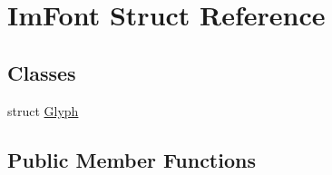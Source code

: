 \hypertarget{struct_im_font}{}\section{Im\+Font Struct Reference}
\label{struct_im_font}
\subsection*{Classes}
\begin{DoxyCompactItemize}
\item 
struct \mbox{\hyperlink{struct_im_font_1_1_glyph}{Glyph}}
\end{DoxyCompactItemize}
\subsection*{Public Member Functions}
